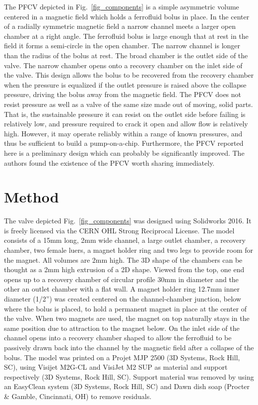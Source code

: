 \documentclass{asme2ej}
\begin{document}
The PFCV depicted in Fig.~\ref{fig_components} is a simple asymmetric volume
centered in a magnetic field
which holds a ferrofluid bolus in place.
In the center of a radially symmetric magnetic field
a narrow channel meets a larger open chamber at a right angle.
The ferrofluid bolus is large enough that at rest in the field it
forms a semi-circle in the open chamber. The narrow channel is
longer than the radius of the bolus at rest.
The broad chamber is the outlet side of the valve.
The narrow chamber opens onto a recovery chamber on the inlet
side of the valve.
This design allows the bolus to be recovered from the recovery
chamber when the pressure is equalized if the outlet pressure is
raised above the collapse pressure, driving the bolus away
from the magnetic field.
The PFCV does not resist pressure as well  as a
valve of the same size
made out of moving, solid parts.
That is, the sustainable
pressure it can resist on the outlet side before failing is relatively
low, and pressure required to crack it open and allow flow is
relatively high.
However, it may operate reliably within a range of
known pressures, and thus be sufficient to build a
pump-on-a-chip.
Furthermore, the PFCV reported here is a preliminary design which
can probably be significantly improved.
The authors found the
existence of the PFCV worth sharing immediately.

\section{Method}

The valve depicted Fig.~\ref{fig_components}
was designed using Solidworks 2016.
It is freely licensed via the CERN OHL Strong Reciprocal License\cite{stuckey2021,stuckey2021stl}.
The model consists of a 15mm long, 2mm wide channel, a large outlet
chamber, a recovery chamber,
two female luers, a magnet holder ring and two legs to provide room
for the magnet.  All volumes are 2mm high.
The 3D shape
of the chambers can be thought as a 2mm high extrusion of a 2D shape.
Viewed from the top, one end opens up to a recovery
chamber of circular profile 30mm in diameter and the other
an outlet chamber with a flat wall.
A magnet holder ring 12.7mm inner diameter (1/2'') was created centered on the channel-chamber
junction, below where the bolus is placed, to hold a permanent magnet in place
at the center of the valve. When two magnets are used, the magnet on
top naturally stays in the same position due to attraction to the magnet below.
On the inlet side of the channel
opens into a recovery chamber shaped to allow the ferrofluid to be
passively drawn back into the channel by the magnetic field after a
collapse of the bolus.
The model was printed on a Projet MJP 2500 (3D
Systems, Rock Hill, SC), using Visijet M2G-CL and VisiJet M2 SUP as
material and support respectively (3D Systems, Rock Hill, SC). Support
material was removed by using an EasyClean system (3D Systems, Rock
Hill, SC) and Dawn dish soap (Procter \& Gamble, Cincinnati, OH) to
remove residuals.
\end{document}
